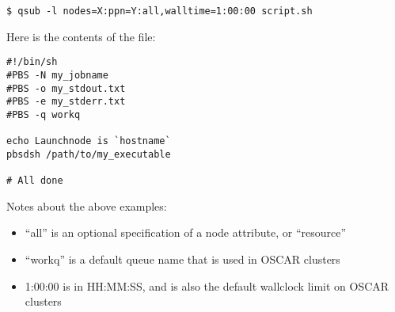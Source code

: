 \begin{verbatim}
$ qsub -l nodes=X:ppn=Y:all,walltime=1:00:00 script.sh
\end{verbatim}

Here is the contents of the  file:

\begin{verbatim}
#!/bin/sh
#PBS -N my_jobname
#PBS -o my_stdout.txt
#PBS -e my_stderr.txt
#PBS -q workq

echo Launchnode is `hostname`
pbsdsh /path/to/my_executable

# All done
\end{verbatim}

Notes about the above examples:
\begin{itemize} 
\item``all'' is an optional specification of a node attribute, or
  ``resource''
  
\item ``workq'' is a default queue name that is used in OSCAR clusters

\item 1:00:00 is in HH:MM:SS, and is also the default wallclock limit on 
  OSCAR clusters
\end{itemize}

